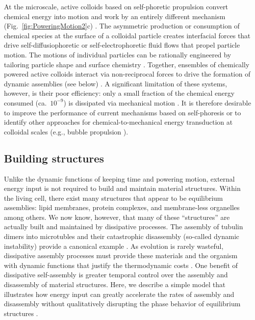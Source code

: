 \begin{appendices}
At the microscale, active colloids based on self-phoretic propulsion convert chemical energy into motion and work by an entirely different mechanism (Fig.~\ref{fig:PoweringMotion2}c) . The asymmetric production or consumption of chemical species at the surface of a colloidal particle creates interfacial forces that drive self-diffusiophoretic or self-electrophoretic fluid flows that propel particle motion.  The motions of individual particles can be rationally engineered by tailoring particle shape and surface chemistry \autocite{brooks2019shape}.  Together, ensembles of chemically powered active colloids interact via non-reciprocal forces to drive the formation of dynamic assemblies (see below) \autocite{wang2015one, Lowen2018}.  A significant limitation of these systems, however, is their poor efficiency: only a small fraction of the chemical energy consumed (ca.~$10^{-9}$) is dissipated via mechanical motion \autocite{wang2013understanding}. It is therefore desirable to improve the performance of current mechanisms based on self-phoresis or to identify other approaches for chemical-to-mechanical energy transduction at colloidal scales (e.g., bubble propulsion \autocite{li2016rocket}). 

\subsection{Building structures}

Unlike the dynamic functions of keeping time and powering motion, external energy input is not required to build and maintain material structures.  Within the living cell, there exist many structures that appear to be equilibrium assemblies: lipid membranes, protein complexes, and membrane-less organelles among others.  We now know, however, that many of these ``structures'' are actually built and maintained by dissipative processes.  The assembly of tubulin dimers into microtubles and their catastrophic disassembly (so-called dynamic instability) provide a canonical example \autocite{Desai1997}. As evolution is rarely wasteful, dissipative assembly processes must provide these materials and the organism with dynamic functions that justify the thermodynamic costs \autocite{Ragazzon2018}. One benefit of dissipative self-assembly \autocite{De2018} is greater temporal control over the assembly and disassembly of material structures.  Here, we describe a simple model that illustrates how energy input can greatly accelerate the rates of assembly and disassembly without qualitatively disrupting the phase behavior of equilibrium structures \autocite{marsland2018active}. 


\end{appendices}
